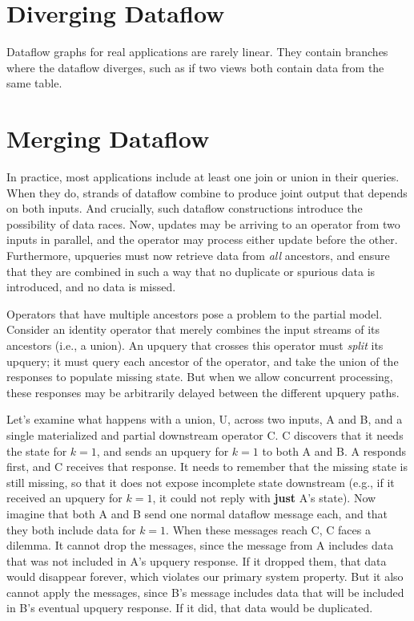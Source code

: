 \section{Diverging Dataflow}

Dataflow graphs for real applications are rarely linear. They contain branches
where the dataflow diverges, such as if two views both contain data from the
same table.

\resume

\section{Merging Dataflow}

In practice, most applications include at least one join or union in their
queries. When they do, strands of dataflow combine to produce joint output that
depends on both inputs. And crucially, such dataflow constructions introduce the
possibility of data races. Now, updates may be arriving to an operator from two
inputs in parallel, and the operator may process either update before the other.
Furthermore, upqueries must now retrieve data from \emph{all} ancestors, and
ensure that they are combined in such a way that no duplicate or spurious data
is introduced, and no data is missed.

\resume

Operators that have multiple ancestors pose a problem to the partial
model. Consider an identity operator that merely combines the input
streams of its ancestors (i.e., a union). An upquery that crosses this
operator must \emph{split} its upquery; it must query each ancestor of the
operator, and take the union of the responses to populate missing state.
But when we allow concurrent processing, these responses may be
arbitrarily delayed between the different upquery paths.

Let's examine what happens with a union, U, across two inputs, A and B,
and a single materialized and partial downstream operator C. C discovers
that it needs the state for $k = 1$, and sends an upquery for $k = 1$ to
both A and B. A responds first, and C receives that response. It needs
to remember that the missing state is still missing, so that it does not
expose incomplete state downstream (e.g., if it received an upquery for
$k = 1$, it could not reply with \textbf{just} A's state). Now imagine that
both A and B send one normal dataflow message each, and that they both
include data for $k = 1$. When these messages reach C, C faces a
dilemma. It cannot drop the messages, since the message from A includes
data that was not included in A's upquery response. If it dropped them,
that data would disappear forever, which violates our primary system
property. But it also cannot apply the messages, since B's message
includes data that will be included in B's eventual upquery response. If
it did, that data would be duplicated.

